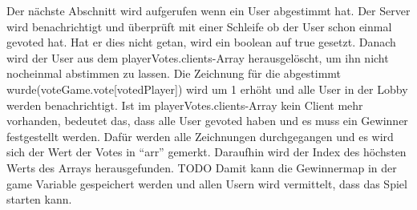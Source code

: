 Der nächste Abschnitt wird aufgerufen wenn ein User abgestimmt hat. Der Server wird benachrichtigt und überprüft mit einer Schleife ob der User 
schon einmal gevoted hat. Hat er dies nicht getan, wird ein boolean auf true gesetzt. 
Danach wird der User aus dem playerVotes.clients-Array herausgelöscht, um ihn nicht nocheinmal abstimmen zu lassen. Die Zeichnung für die abgestimmt wurde(voteGame.vote[votedPlayer]) wird um 1 erhöht und alle User in der Lobby werden benachrichtigt. 
Ist im playerVotes.clients-Array kein Client mehr vorhanden, bedeutet das, dass alle User gevoted haben und es muss ein Gewinner festgestellt werden. 
Dafür werden alle Zeichnungen durchgegangen und es wird sich der Wert der Votes in ``arr'' gemerkt. Daraufhin wird der Index des höchsten Werts des Arrays herausgefunden. TODO
Damit kann die Gewinnermap in der game Variable gespeichert werden und allen Usern wird vermittelt, dass das Spiel starten kann. 

